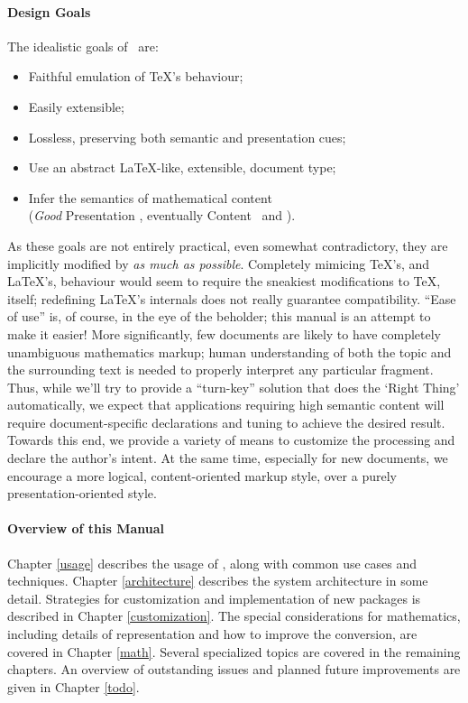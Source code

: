 \documentclass{book}
\begin{document}
\paragraph{Design Goals}\label{intro.goals} The idealistic goals of \LaTeXML\ are:
\begin{itemize}
\item Faithful emulation of \TeX's behaviour;
\item Easily extensible;
\item Lossless, preserving both semantic and presentation cues;
\item Use an abstract \LaTeX-like, extensible, document type;
\item Infer the semantics of mathematical content\\
    (\emph{Good} Presentation \MathML, eventually Content \MathML\ and \OpenMath).
\end{itemize}

As these goals are not entirely practical, even somewhat contradictory,
they are implicitly modified by \emph{as much as possible}.
Completely mimicing \TeX's, and \LaTeX's, behaviour would seem to require the
sneakiest modifications to \TeX, itself; redefining \LaTeX's internals does 
not really guarantee compatibility. ``Ease of use'' is, of course, in the eye of the beholder;
this manual is an attempt to make it easier!
More significantly, few documents are likely to have completely unambiguous
mathematics markup; human understanding of both the topic and the surrounding 
text is needed to properly interpret any particular fragment.
Thus, while we'll try to provide a ``turn-key'' solution that does the `Right Thing'
automatically, we expect that applications requiring high semantic content will require
document-specific declarations and tuning to achieve the desired result.
Towards this end, we provide a variety
of means to customize the processing and declare the author's intent.
At the same time, especially for new documents, we encourage a more logical, 
content-oriented markup style, over a purely presentation-oriented style.

\paragraph[Overview]{Overview of this Manual}\label{intro.overview}
Chapter \ref{usage} describes the usage of \LaTeXML, along with
common use cases and techniques.  Chapter \ref{architecture} describes
the system architecture in some detail. Strategies for customization
and implementation of new packages is described in Chapter \ref{customization}.
The special considerations for mathematics, including details of representation
and how to improve the conversion, are covered in Chapter \ref{math}.
Several specialized topics are covered in the remaining chapters.
An overview of outstanding issues and planned future improvements
are given in Chapter \ref{todo}.
\end{document}
